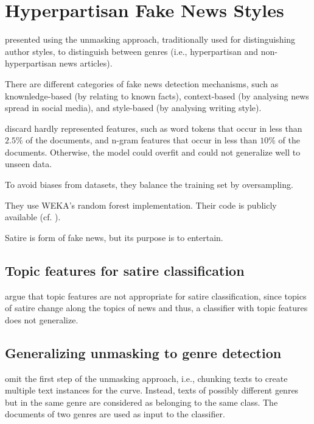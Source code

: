 \section{Hyperpartisan Fake News Styles}
\label{sec:hyperpartisan_fake_news_styles}

\citet{potthast_stylometric_2018} presented using the unmasking approach, traditionally used for distinguishing author styles, 
to distinguish between genres (i.e., hyperpartisan and non-hyperpartisan news articles). 

There are different categories of fake news detection mechanisms, such as knownledge-based (by relating to known facts), 
context-based (by analysing news spread in social media), and style-based (by analysing writing style).

\citet{potthast_stylometric_2018} discard hardly represented features, such as word tokens that occur in less than $2.5 \%$ of the documents, 
and n-gram features that occur in less than $10 \%$ of the documents.
Otherwise, the model could overfit and could not generalize well to unseen data.

To avoid biases from datasets, they balance the training set by oversampling.

They use WEKA's random forest implementation.
Their code is publicly available (cf. \cite{potthast_stylometric_2018}). 

Satire is form of fake news, but its purpose is to entertain.

\subsection{Topic features for satire classification}
\label{sec:topic_features_for_sarcasm_classification}

\citet{potthast_stylometric_2018} argue that topic features are not appropriate for satire classification, 
since topics of satire change along the topics of news and thus, a classifier with topic features does not generalize.

\subsection{Generalizing unmasking to genre detection}
\label{sec:generalizing_unmasking_to_genre_detection}

\citet{potthast_stylometric_2018} omit the first step of the unmasking approach, i.e., chunking texts to create multiple text instances for the curve.
Instead, texts of possibly different genres but in the same genre are considered as belonging to the same class.
The documents of two genres are used as input to the classifier.
